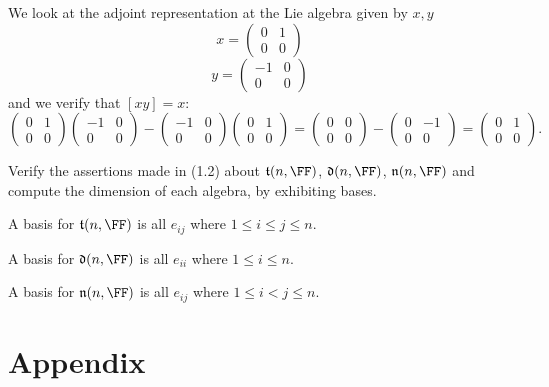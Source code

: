 \documentclass{article}
\newcommand{\lb}[1]{\ensuremath{\left[{#1}\right]}}
\newcommand{\talg}{\ensuremath{\mathfrak{t}}}
\newcommand{\dalg}{\ensuremath{\mathfrak{d}}}
\newcommand{\nalg}{\ensuremath{\mathfrak{n}}}
\begin{document}
We look at the adjoint representation at the Lie algebra given by $x, y$
\[
    x
    =
    \begin{pmatrix}
        0 & 1 \\
        0 & 0 
    \end{pmatrix}
\]
\[
    y
    =
    \begin{pmatrix}
        -1 & 0 \\
        0 & 0 
    \end{pmatrix}
\]
and we verify that $\lb{xy} = x$:
\[
    \begin{pmatrix}
        0 & 1 \\
        0 & 0 
    \end{pmatrix}
    \begin{pmatrix}
        -1 & 0 \\
        0 & 0 
    \end{pmatrix}
    -
    \begin{pmatrix}
        -1 & 0 \\
        0 & 0 
    \end{pmatrix}
    \begin{pmatrix}
        0 & 1 \\
        0 & 0 
    \end{pmatrix}
    =
    \begin{pmatrix}
        0 & 0 \\
        0 & 0
    \end{pmatrix}
    -
    \begin{pmatrix}
        0 & -1 \\
        0 & 0 
    \end{pmatrix}
    =
    \begin{pmatrix}
        0 & 1 \\
        0 & 0 
    \end{pmatrix}.
\]

\begin{exercise}
    Verify the assertions made in (1.2) about $\talg(n,\FF)$, $\dalg(n,\FF)$, $\nalg(n,\FF)$ and compute the dimension of each algebra, by exhibiting bases.
\end{exercise}

A basis for $\talg(n, \FF)$ is all $e_{ij}$ where $1 \leq i \leq j \leq n$.

A basis for $\dalg(n, \FF)$ is all $e_{ii}$ where $1 \leq i \leq n$.

A basis for $\nalg(n, \FF)$ is all $e_{ij}$ where $1 \leq i < j \leq n$.

\section{Appendix}
\end{document}
